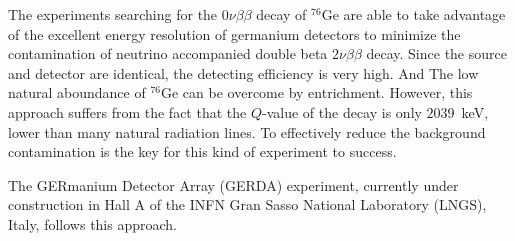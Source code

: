 The experiments searching for the $0\nu\beta\beta$ decay of $^{76}$Ge are able to take advantage of the excellent energy resolution of germanium detectors to minimize the contamination of neutrino accompanied double beta $2\nu\beta\beta$ decay. Since the source and detector are identical, the detecting efficiency is very high. And The low natural aboundance of $^{76}$Ge can be overcome by entrichment. However, this approach suffers from the fact that the $Q$-value of the decay is only $2039$~keV, lower than many natural radiation lines. To effectively reduce the background contamination is the key for this kind of experiment to success.

The GERmanium Detector Array (GERDA) experiment, currently under construction in Hall A of the INFN Gran Sasso National Laboratory (LNGS), Italy, follows this approach. 

